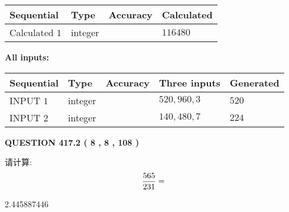 \documentclass{ctexart}
\begin{document}
   
   
   
\noindent{}
   
   
  
  
\noindent\begin{tabular}{|l|l|l|l|}
\hline
 Sequential & Type & Accuracy & Calculated \\ 
\hline
 
 
  Calculated $  1 $ & integer &  & 
  $ 116480 $ 
 \\  \hline  
 \end{tabular}
   
   
   
   
\noindent\vspace{0.1in}\hspace{-0.08in} {\textbf{\Large{All inputs: }}}
   
   
  
  
\noindent\begin{tabular}{|l|l|l|l|l|}
\hline
 Sequential & Type & Accuracy & Three inputs & Generated \\ 
\hline
 
 
  INPUT $  1 $ & integer &  & $
 520
 , 
 960
 , 
 3
 $ & $ 520 $ 
 \\  \hline  
 
 
  INPUT $  2 $ & integer &  & $
 140
 , 
 480
 , 
 7
 $ & $ 224 $ 
 \\  \hline  
 \end{tabular}
   
   
  
\vspace{0.2in}
  
{\textbf{\Large{QUESTION
417.2 
 ( 8 , 8 , 108 )
}}}
  
  
 
请计算:
\begin{equation}
\frac { %
565 }  {  %
231} = \nonumber
\end{equation}
 
 
 
\noindent{}
 
 

2.445887446
 
 
\noindent{}
 
 

 
 
 
\noindent{}
 
\end{document}
